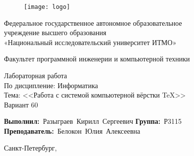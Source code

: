 \newcommand{\Faculty}{Факультет программной инженерии и компьютерной техники}

\newcommand{\TeacherPosition}{}
\newcommand{\TeacherName}{Белокон Юлия Алексеевна}

\newcommand{\LabSubject}{Информатика}
\newcommand{\LabNumber}{\textnumero 6}
\newcommand{\LabName}{Работа с системой компьютерной вёрстки \TeX}
\newcommand{\Variant}{60}

\newcommand{\StudentGroup}{Р3115}
\newcommand{\StudentName}{Разыграев Кирилл Сергеевич}


\thispagestyle{empty}

\begin{figure}[h]
	\centering
	\texttt{[image: logo]}
\end{figure}
\vspace{-\baselineskip}


\begin{center}
	Федеральное государственное автономное образовательное \\
	учреждение высшего образования\\
	«Национальный исследовательский университет ИТМО»
\end{center}\par

\begin{center}
	\vspace{12pt}
	\Faculty
\end{center}\par

\vspace{\fill}
\begin{center}
	Лабораторная работа \LabNumber \\
	По дисципление: \LabSubject \\
	Тема: <<\LabName>> \\
	Вариант \Variant
\end{center}\par

\vspace{\fill}
\vbox{
	\hfill
	\vbox{
		\hbox{\textbf{Выполнил:} \StudentName}
		\hbox{\textbf{Группа:} \StudentGroup \\}
		\hbox{\textbf{Преподаватель:} \TeacherPosition \TeacherName}
	}
} 


\vspace{\fill}
\begin{center}
	Санкт-Петербург, \the\year{}
\end{center}\par

\newpage

